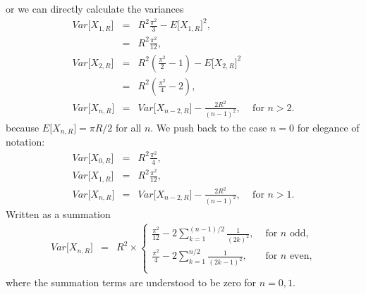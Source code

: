 or we can directly calculate the variances
\begin{eqnarray}
  \label{eq:mean_nsphere_geo}
  Var\big[ X_{1,R} \big] & = & R^2 \frac{\pi^2}{3} - E\big[ X_{1,R} \big]^2, \nonumber\\ 
              & = & R^2 \frac{\pi^2}{12}, \nonumber\\ 
  Var\big[ X_{2,R} \big] & = &  R^2 \left( \frac{\pi^2}{2} - 1 \right) - E\big[ X_{2,R} \big]^2 \nonumber\\ 
               & = & R^2\left(  \frac{\pi^2}{4} - 2 \right), \nonumber\\ 
  Var\big[ X_{n,R} \big] & = & Var\big[ X_{n-2,R} \big] 
                                   - \frac{2 R^2}{(n-1)^2}, \;\;\;
                                   \mbox{ for } n > 2.\nonumber
\end{eqnarray}
because $E\big[ X_{n,R} \big] = \pi R /2$ for all $n$.  We push back
to the case $n=0$ for elegance of notation: 
\begin{eqnarray}
  \label{eq:mean_nsphere_geo}
  Var\big[ X_{0,R} \big] & = & R^2 \frac{\pi^2}{4}, \\ 
  Var\big[ X_{1,R} \big] & = & R^2 \frac{\pi^2}{12}, \\ 
  Var\big[ X_{n,R} \big] & = & Var\big[ X_{n-2,R} \big] 
                                   - \frac{2 R^2}{(n-1)^2}, \;\;\;
                                   \mbox{ for } n > 1.
\end{eqnarray}
Written as a summation
\begin{eqnarray}
  \label{eq:mean_nsphere_geo}
  Var\big[ X_{n,R} \big] & = & R^2 \times \left\{ \begin{array}{ll}
      \displaystyle
         \frac{\pi^2}{12} 
        - 2 \sum_{k=1}^{(n-1)/2} \frac{1}{(2k)^2}, & 
          \mbox{ for $n$ odd,} \\ 
      \displaystyle
          \frac{\pi^2}{4} 
        - 2 \sum_{k=1}^{n/2} \frac{1}{(2k-1)^2}, &
          \mbox{ for $n$ even,} \\ 
    \end{array} \right.
\end{eqnarray}
where the summation terms are understood to be zero for $n=0, 1$.

